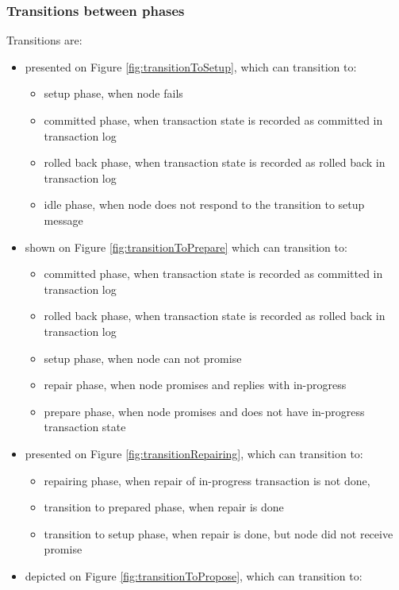\subsubsection{Transitions between phases}
Transitions are:
\begin{itemize}
\item \setupTransition presented on Figure \ref{fig:transitionToSetup}, which can transition to:
	\begin{itemize}
		\item setup phase, when node  fails
		\item committed phase, when transaction state \txState is recorded as committed in transaction log \txLog  
		\item rolled back phase, when transaction state \txState is recorded as rolled back in transaction log \txLog
		\item idle phase, when node  does not respond to the transition to setup message
	\end{itemize}
\item \prepareTransition shown on Figure \ref{fig:transitionToPrepare} which can transition to:
	\begin{itemize}
		\item committed phase, when transaction state \txState is recorded as committed in transaction log \txLog  
		\item rolled back phase, when transaction state \txState is recorded as rolled back in transaction log \txLog
		\item setup phase, when node  can not promise
		\item repair phase, when node  promises and replies with in-progress \txState
		\item prepare phase, when node  promises and does not have in-progress transaction state \txState 
	\end{itemize}
\item \repairingTransition presented on Figure \ref{fig:transitionRepairing}, which can transition to:
	\begin{itemize}
		\item repairing phase, when repair of in-progress transaction is not done,
		\item transition to prepared phase, when repair is done
		\item transition to setup phase, when repair is done, but node  did not receive promise
	\end{itemize}
\item \proposeTransition depicted on Figure \ref{fig:transitionToPropose}, which can transition to:

\end{itemize}
